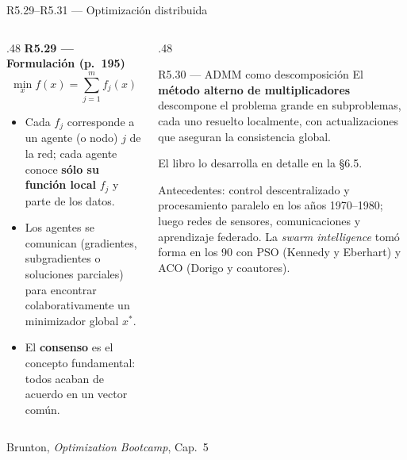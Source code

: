 \documentclass[10pt,aspectratio=169]{beamer}
\newcommand{\fuente}{\vfill{\scriptsize\color{gray}Brunton, \emph{Optimization Bootcamp}, Cap.~5}}
\begin{document}
\begin{frame}{R5.29--R5.31 --- Optimización distribuida}
  \small
  \begin{columns}[T,onlytextwidth]
    \begin{column}{.48\textwidth}
      \textbf{R5.29 --- Formulación (p.~195)}
      \[
        \min_x f(x) = \sum_{j=1}^{m} f_j(x)
      \]
      \begin{itemize}
        \item Cada $f_j$ corresponde a un agente (o nodo) $j$ de la red; cada
          agente conoce \textbf{sólo su función local} $f_j$ y parte de los
          datos.
        \item Los agentes se comunican (gradientes, subgradientes o soluciones
          parciales) para encontrar colaborativamente un minimizador global
          $x^\ast$.
        \item El \textbf{consenso} es el concepto fundamental: todos acaban
          de acuerdo en un vector común.
      \end{itemize}
    \end{column}
    \begin{column}{.48\textwidth}
      \begin{block}{R5.30 --- ADMM como descomposición}
        \small
        El \textbf{método alterno de multiplicadores} descompone el problema
        grande en subproblemas, cada uno resuelto localmente, con actualizaciones
        que aseguran la consistencia global.
        \par\medskip
        El libro lo desarrolla en detalle en la \S6.5.
      \end{block}
      \vspace{1mm}
      {\footnotesize\color{gray}
       Antecedentes: control descentralizado y procesamiento paralelo en los
       años 1970--1980; luego redes de sensores, comunicaciones y aprendizaje
       federado. La \emph{swarm intelligence} tomó forma en los 90 con PSO
       (Kennedy y Eberhart) y ACO (Dorigo y coautores).}
    \end{column}
  \end{columns}
  \fuente
\end{frame}
\end{document}
